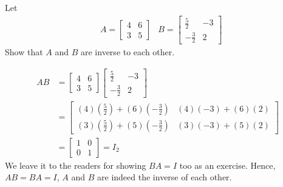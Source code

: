 \begin{exmp}
Let 
\begin{align*}
& A =
\begin{bmatrix}
4 & 6 \\
3 & 5
\end{bmatrix}
& B =
\begin{bmatrix}
\frac{5}{2} & -3 \\
-\frac{3}{2} & 2
\end{bmatrix}
\end{align*}
Show that $A$ and $B$ are inverse to each other.
\end{exmp}
\begin{solution}
\begin{align*}
AB &= 
\begin{bmatrix}
4 & 6 \\
3 & 5
\end{bmatrix}
\begin{bmatrix}
\frac{5}{2} & -3 \\
-\frac{3}{2} & 2
\end{bmatrix} \\
&= 
\begin{bmatrix}
(4)(\frac{5}{2})+(6)(-\frac{3}{2}) & (4)(-3)+(6)(2) \\
(3)(\frac{5}{2})+(5)(-\frac{3}{2}) & (3)(-3)+(5)(2)
\end{bmatrix} \\
&= 
\begin{bmatrix}
1 & 0 \\
0 & 1
\end{bmatrix} = I_2
\end{align*}
We leave it to the readers for showing $BA = I$ too as an exercise. Hence, $AB = BA = I$, $A$ and $B$ are indeed the inverse of each other.
\end{solution}

